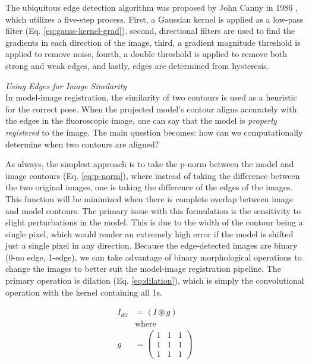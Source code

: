 The ubiquitous edge detection algorithm was proposed by John Canny in 1986 \cite{cannyComputationalApproachEdge1986}, which utilizes a five-step process. First, a Gaussian kernel is applied as a low-pass filter (Eq. \ref{eq:gauss-kernel-grad}), second, directional filters are used to find the gradients in each direction of the image, third, a gradient magnitude threshold is applied to remove noise, fourth, a double threshold is applied to remove both strong and weak edges, and lastly, edges are determined from hysteresis. 

\emph{Using Edges for Image Similarity}\\
In model-image registration, the similarity of two contours is used as a heuristic for the correct pose. When the projected model's contour aligns accurately with the edges in the fluoroscopic image, one can say that the model is \emph{properly registered} to the image. The main question becomes: how can we computationally determine when two contours are aligned?

As always, the simplest approach is to take the p-norm between the model and image contours (Eq. \ref{eq:p-norm}), where instead of taking the difference between the two original images, one is taking the difference of the edges of the images. This function will be minimized when there is complete overlap between image and model contours. The primary issue with this formulation is the sensitivity to slight perturbations in the model. This is due to the width of the contour being a single pixel, which would render an extremely high error if the model is shifted just a single pixel in any direction. Because the edge-detected images are binary (0-no edge, 1-edge), we can take advantage of binary morphological operations to change the images to better suit the model-image registration pipeline. The primary operation is dilation (Eq. \ref{eq:dilation}), which is simply the convolutional operation with the kernel containing all 1s.

\begin{equation}
\begin{aligned}
    I_{dil} &= (I \circledast g)\\
    &\text{where} \\
    g &= \begin{pmatrix}
        1 & 1 & 1 \\ 1 & 1 & 1 \\ 1& 1 & 1
    \end{pmatrix}
\end{aligned}
\label{eq:dilation}
\end{equation}

